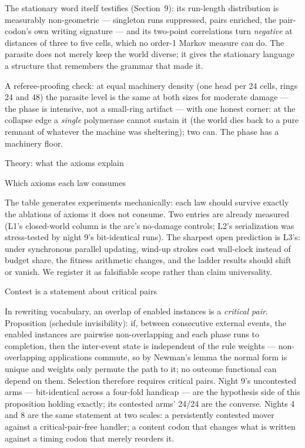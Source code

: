 The stationary word itself testifies (Section~9): its run-length
distribution is measurably non-geometric --- singleton runs
suppressed, pairs enriched, the pair-codon's own writing signature
--- and its two-point correlations turn {\it negative} at
distances of three to five cells, which no order-1 Markov measure
can do. The parasite does not merely keep the world diverse; it
gives the stationary language a structure that remembers the
grammar that made it.

A referee-proofing check: at equal machinery density (one head per
24 cells, rings 24 and 48) the parasite level is the same at both
sizes for moderate damage --- the phase is intensive, not a
small-ring artifact --- with one honest corner: at the collapse
edge a {\it single} polymerase cannot sustain it (the world dies
back to a pure remnant of whatever the machine was sheltering);
two can. The phase has a machinery floor.

\sec Theory: what the axioms explain

\secc Which axioms each law consumes

\medskip
\noindent{}
\medskip

\noindent The table generates experiments mechanically: each law
should survive exactly the ablations of axioms it does not
consume. Two entries are already measured (L1's closed-world
column is the arc's no-damage controls; L2's serialization was
stress-tested by night 9's bit-identical runs). The sharpest open
prediction is L3's: under synchronous parallel updating,
wind-up strokes cost wall-clock instead of budget share, the
fitness arithmetic changes, and the ladder results should shift or
vanish. We register it as falsifiable scope
rather than claim universality.

\secc Contest is a statement about critical pairs

In rewriting vocabulary, an overlap of enabled instances is a
{\it critical pair}. Proposition (schedule invisibility): if,
between consecutive external events, the enabled instances are
pairwise non-overlapping and each phase runs to completion, then
the inter-event state is independent of the rule weights ---
non-overlapping applications commute, so by Newman's lemma the
normal form is unique and weights only permute the path to it; no
outcome functional can depend on them. Selection therefore
requires critical pairs. Night 9's uncontested arms ---
bit-identical across a four-fold handicap --- are the hypothesis
side of this proposition holding exactly; its contested arms'
24/24 are the converse. Nights 4 and 8 are the same statement at
two scales: a persistently contested mover against a
critical-pair-free handler; a content codon that changes what is
written against a timing codon that merely reorders it.


